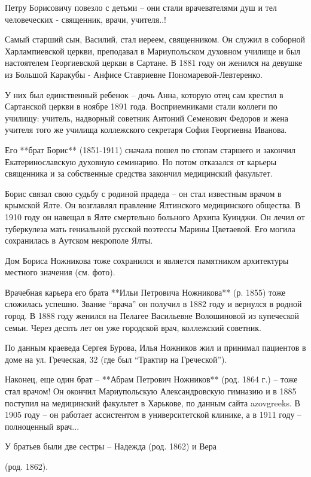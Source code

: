 Петру Борисовичу повезло с детьми – они стали врачевателями душ и тел
человеческих - священник, врачи, учителя..!

Самый старший сын, Василий, стал иереем, священником. Он служил в соборной
Харлампиевской церкви, преподавал в Мариупольском духовном училище и был
настоятелем Георгиевской церкви в Сартане. В 1881 году он женился на девушке из
Большой Каракубы - Анфисе Ставриевне Пономаревой-Левтеренко.

У них был единственный ребенок – дочь Анна, которую отец сам крестил в
Сартанской церкви в ноябре 1891 года. Восприемниками стали коллеги по училищу:
учитель, надворный советник Антоний Семенович Федоров и жена учителя того же
училища коллежского секретаря София Георгиевна Иванова.

Его **брат Борис** (1851-1911) сначала пошел по стопам старшего и закончил
Екатеринославскую духовную семинарию. Но потом отказался от карьеры священника
и за собственные средства закончил медицинский факультет.

Борис связал свою судьбу с родиной прадеда – он стал известным врачом в
крымской Ялте. Он возглавлял правление Ялтинского медицинского общества. В 1910
году он навещал в Ялте смертельно больного Архипа Куинджи. Он лечил от
туберкулеза мать гениальной русской поэтессы Марины Цветаевой. Его могила
сохранилась в Аутском некрополе Ялты.

Дом Бориса Ножникова тоже сохранился и является памятником архитектуры местного
значения (см. фото).

Врачебная карьера его брата **Ильи Петровича Ножникова** (р. 1855) тоже
сложилась успешно. Звание \enquote{врача} он получил в 1882 году и вернулся в родной
город. В 1888 году женился на Пелагее Васильевне Волошиновой из купеческой
семьи. Через десять лет он уже городской врач, коллежский советник.

По данным краеведа Сергея Бурова, Илья Ножников жил и принимал пациентов в доме
на ул. Греческая, 32 (где был \enquote{Трактир на Греческой}).

Наконец, еще один брат – **Абрам Петрович Ножников** (род. 1864 г.) – тоже стал
врачом! Он окончил Мариупольскую Александровскую гимназию и в 1885 поступил на
медицинский факультет в Харькове, по данным сайта azovgreeks. В 1905 году – он
работает ассистентом в университетской клинике, а в 1911 году – полноценный
врач...

У братьев были две сестры – Надежда (род. 1862) и Вера\par\noindent (род. 1862).

